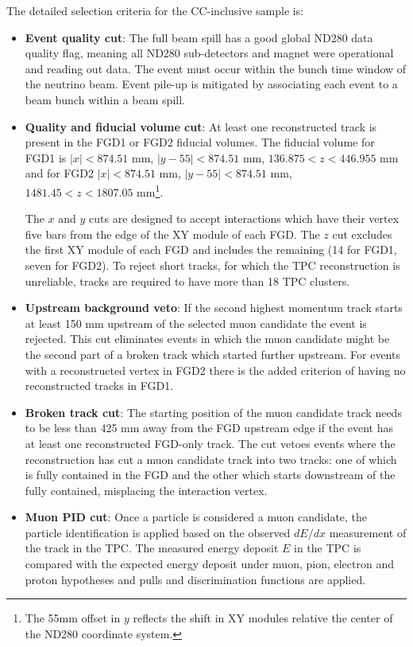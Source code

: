 The detailed selection criteria for the CC-inclusive sample is:
\begin{itemize}
	\item \textbf{Event quality cut}: The full beam spill has a good global ND280 data quality flag, meaning all ND280 sub-detectors and magnet were operational and reading out data. The event must occur within the bunch time window of the neutrino beam. Event pile-up is mitigated by associating each event to a beam bunch within a beam spill.
	
	\item \textbf{Quality and fiducial volume cut}: At least one reconstructed track is present in the FGD1 or FGD2 fiducial volumes. The fiducial volume for FGD1 is $|x|<874.51\text{ mm}$, $|y-55|<874.51\text{ mm}$, $136.875 < z < 446.955\text{ mm}$ and for FGD2 $|x|<874.51\text{ mm}$, $|y-55|<874.51\text{ mm}$, $1481.45< z < 1807.05\text{ mm}$\footnote{The 55mm offset in $y$ reflects the shift in XY modules relative the center of the ND280 coordinate system.}.
	
	The $x$ and $y$ cuts are designed to accept interactions which have their vertex five bars from the edge of the XY module of each FGD. The $z$ cut excludes the first XY module of each FGD and includes the remaining (14 for FGD1, seven for FGD2). To reject short tracks, for which the TPC reconstruction is unreliable, tracks are required to have more than 18 TPC clusters.
	
	\item \textbf{Upstream background veto}: If the second highest momentum track starts at least 150 mm upstream of the selected muon candidate the event is rejected. This cut eliminates events in which the muon candidate might be the second part of a broken track which started further upstream. For events with a reconstructed vertex in FGD2 there is the added criterion of having no reconstructed tracks in FGD1.
	
	\item \textbf{Broken track cut}: The starting position of the muon candidate track needs to be less than 425 mm away from the FGD upstream edge if the event has at least one reconstructed FGD-only track. The cut vetoes events where the reconstruction has cut a muon candidate track into two tracks: one of which is fully contained in the FGD and the other which starts downstream of the fully contained, misplacing the interaction vertex.
	
	\item \textbf{Muon PID cut}: Once a particle is considered a muon candidate, the particle identification is applied based on the observed $dE/dx$ measurement of the track in the TPC. The measured energy deposit $E$ in the TPC is compared with the expected energy deposit under muon, pion, electron and proton hypotheses and pulls and discrimination functions are applied.
	

\end{itemize}
